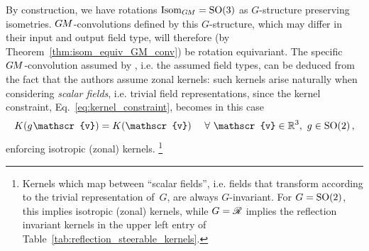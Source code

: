 By construction, we have rotations $\operatorname{Isom}_{G\mkern-1.4muM} = \operatorname{SO}(3)$ as $G$-structure preserving isometries.
$G\mkern-1.4muM$-convolutions defined by this $G$-structure, which may differ in their input and output field type, will therefore (by Theorem~\ref{thm:isom_equiv_GM_conv}) be rotation equivariant.
The specific $G\mkern-1.4muM$-convolution assumed by \citet{ramasinghe2019representation}, i.e. the assumed field types, can be deduced from the fact that the authors assume zonal kernels:
such kernels arise naturally when considering \emph{scalar fields}, i.e. trivial field representations, since the kernel constraint, Eq.~\eqref{eq:kernel_constraint}, becomes in this case 
\begin{align}\label{eq:Euc3_punctured_SO2_constraint}
    K(g\mkern1mu \mathscr{v}) = K(\mathscr{v}) \quad\ \forall\ \mathscr{v}\in\R^3,\ g\in\SO2 \,,
\end{align}
enforcing isotropic (zonal) kernels.%
\footnote{
    Kernels which map between ``scalar fields'', i.e. fields that transform according to the trivial representation of~$G$, are always $G$-invariant.
    For $G=\operatorname{SO}(2)$, this implies isotropic (zonal) kernels, while $G=\mathscr{R}$ implies the reflection invariant kernels in the upper left entry of Table~\ref{tab:reflection_steerable_kernels}.
}



